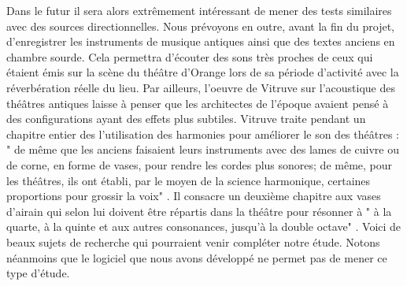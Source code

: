 Dans le futur il sera alors extrêmement intéressant de mener des tests similaires avec des sources directionnelles. Nous prévoyons en outre, avant la fin du projet, d'enregistrer les instruments de musique antiques ainsi que des textes anciens en chambre sourde. Cela permettra d'écouter des sons très proches de ceux qui étaient émis sur la scène du théâtre d'Orange lors de sa période d'activité avec la réverbération réelle du lieu. Par ailleurs, l'oeuvre de Vitruve sur l'acoustique des théâtres antiques \cite[Livre V]{vitruve} laisse à penser que les architectes de l'époque avaient pensé à des configurations ayant des effets plus subtiles. Vitruve traite pendant un chapitre entier des l'utilisation des harmonies pour améliorer le son des théâtres : " de même que les anciens faisaient leurs instruments avec des lames de cuivre ou de corne, en forme de vases, pour rendre les cordes plus sonores; de même, pour les théâtres, ils ont établi, par le moyen de la science harmonique, certaines proportions pour grossir la voix" \cite[p.7]{vitruve}. Il consacre un deuxième chapitre aux vases d'airain qui selon lui doivent être répartis dans la théâtre pour résonner à " à la quarte, à la quinte et aux autres consonances, jusqu'à la double octave" \cite[p.8]{vitruve}. Voici de beaux sujets de recherche qui pourraient venir compléter notre étude. Notons néanmoins que le logiciel que nous avons développé ne permet pas de mener ce type d'étude.

\newpage

 
 
